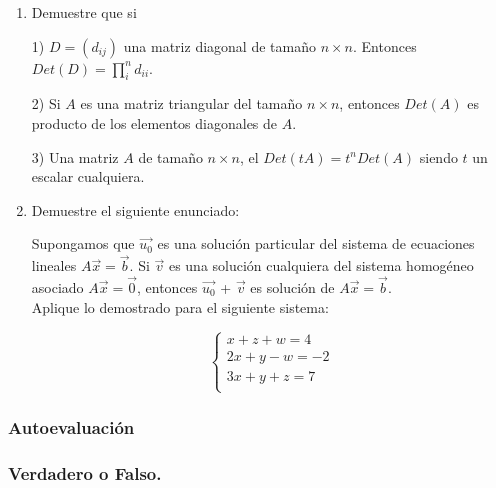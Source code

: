\begin{enumerate}
\bigskip

 
 \bigskip


 
\item
Demuestre que si

1) $D = (d_{ij})$ una matriz diagonal de tamaño $n \times n$. Entonces $Det(D) = \prod_i^nd_{ii}$.

2) Si $A$ es una matriz triangular del tamaño $n \times n$, entonces $Det(A)$ es producto de los elementos diagonales de $A$.

3) Una matriz $A$ de tamaño $n \times n$, el $Det(tA)= t^{n}Det(A)$ siendo $t$ un escalar cualquiera.

 \item
 
 Demuestre el siguiente enunciado:
 
 Supongamos que $\vec{u_0}$ es una solución particular del sistema de ecuaciones lineales $A\vec{x}= \vec{b}$.
 Si $\vec{v}$ es una solución cualquiera del sistema homogéneo asociado $A\vec{x}= \vec{0}$,  entonces
 $\vec{u_0}$ + $\vec{v}$ es solución de  $A\vec{x}= \vec{b}$.\\

Aplique lo demostrado para el siguiente sistema:

\[
\left\{
\begin{array}{ll}
x + z + w = 4 \\
2x + y - w = -2\\
3x + y + z= 7\\
\end{array}
\right.
\]

\bigskip





\end{enumerate}

\bigskip

\subsubsection{Autoevaluación}
 
 \bigskip



\subsubsection{Verdadero o Falso.}


